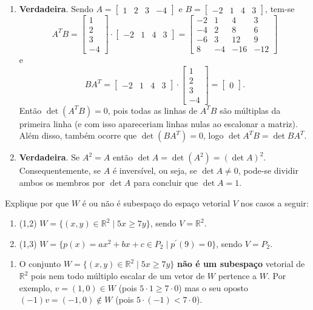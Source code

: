 \documentclass[12pt,a4paper]{article}
\newcommand*\R{\mathbb{R}}
\begin{document}
\begin{ExerciseList}
\begin{enumerate}
\item \textbf{Verdadeira}. Sendo $A = \begin{bmatrix}
1 & 2 & 3 & -4
\end{bmatrix}$ e $B = \begin{bmatrix}
-2 & 1 & 4 & 3
\end{bmatrix}$, tem-se
\[
A^TB = \begin{bmatrix}
1 \\ 2 \\ 3 \\ -4
\end{bmatrix} \cdot
\begin{bmatrix}
-2 & 1 & 4 & 3
\end{bmatrix}
=
\begin{bmatrix}
-2 &  1 &   4 &   3 \\
-4 &  2 &   8 &   6 \\
-6 &  3 &  12 &   9 \\
 8 & -4 & -16 & -12
\end{bmatrix}
\]
e
\[
BA^T = \begin{bmatrix}
-2 & 1 & 4 & 3
\end{bmatrix}
\cdot
\begin{bmatrix}
1 \\ 2 \\ 3 \\ -4
\end{bmatrix}
=
\begin{bmatrix}
0
\end{bmatrix}.
\]
Então $\det(A^T B) = 0$, pois todas as linhas de $A^T B$ são múltiplas da primeira linha (e com isso apareceriam linhas nulas ao escalonar a matriz). Além disso, também ocorre que $\det(B A^T) = 0$, logo $\det{A^T B} = \det{BA^T}$.

\item \textbf{Verdadeira}. Se $A^2 = A$ então $\det{A} = \det{(A^2)} = (\det{A})^2$. Consequentemente, se $A$ é inversível, ou seja, se $\det{A} \neq 0$, pode-se dividir ambos os membros por $\det{A}$ para concluir que $\det{A} = 1$.
\end{enumerate}


\Exercise[title={2,5}]
Explique por que $W$ é ou não é subespaço do espaço vetorial $V$ nos casos a seguir:
\begin{enumerate}
\item (1,2) $W = \{ (x,y) \in \R^2 \mid 5x \geq 7y \}$, sendo $V = \R^2$.
\item (1,3) $W = \{ p(x) = ax^2+bx+c \in P_2 \mid p^\prime(9) = 0 \}$, sendo $V = P_2$.
\end{enumerate}
\Answer
\begin{enumerate}
\item O conjunto $W = \{ (x,y) \in \R^2 \mid 5x \geq 7y \}$ \textbf{não é um subespaço} vetorial de $\R^2$ pois nem todo múltiplo escalar de um vetor de $W$ pertence a $W$. Por exemplo, $v = (1,0) \in W$ (pois $5 \cdot 1 \geq 7 \cdot 0$) mas o seu oposto $(-1)v = (-1,0) \not \in W$ (pois $5 \cdot (-1) < 7 \cdot 0$).


\end{enumerate}
\end{ExerciseList}
\end{document}
